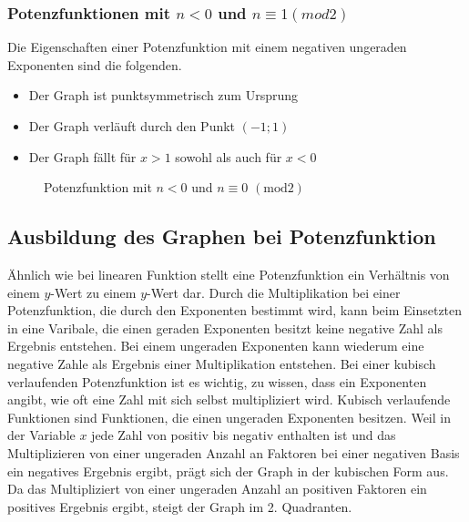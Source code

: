 \subsubsection{Potenzfunktionen mit $n<0$ und $n\equiv1(mod2)$}
Die Eigenschaften einer Potenzfunktion mit einem negativen ungeraden Exponenten sind die folgenden. 
\begin{itemize}
	\item Der Graph ist punktsymmetrisch zum Ursprung
	\item Der Graph verläuft durch den Punkt $(-1;1)$
	\item Der Graph fällt für $x>1$ sowohl als auch für $x<0$
\end{itemize}
\begin{figure}[h]
\centering
{}
\caption{Potenzfunktion mit $n<0$ und $ n\equiv0$ $(\mathrm{mod}2)$}
\end{figure}
\subsection{Ausbildung des Graphen bei Potenzfunktion}\label{sec:Potenzfunktionen/Ausbildung des Graphen bei Potenzfunktionen}
Ähnlich wie bei linearen Funktion stellt eine Potenzfunktion ein Verhältnis von einem $y$-Wert zu einem $y$-Wert dar. Durch die Multiplikation bei einer Potenzfunktion, die durch den Exponenten bestimmt wird, kann beim Einsetzten in eine Varibale, die einen geraden Exponenten besitzt keine negative Zahl als Ergebnis entstehen. Bei einem ungeraden Exponenten kann wiederum eine negative Zahle als Ergebnis einer Multiplikation entstehen. Bei einer kubisch verlaufenden Potenzfunktion ist es wichtig, zu wissen, dass ein Exponenten angibt, wie oft eine Zahl mit sich selbst multipliziert wird. Kubisch verlaufende Funktionen sind Funktionen, die einen ungeraden Exponenten besitzen. Weil in der Variable $x$ jede Zahl von positiv bis negativ enthalten ist und das Multiplizieren von einer ungeraden Anzahl an Faktoren bei einer negativen Basis ein negatives Ergebnis ergibt, prägt sich der Graph in der kubischen Form aus. Da das Multipliziert von einer ungeraden Anzahl an positiven Faktoren ein positives Ergebnis ergibt, steigt der Graph im 2. Quadranten. 



